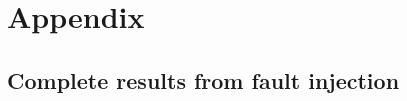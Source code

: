 \section{Appendix}

\subsection{Complete results from fault injection}\label{appendix:complete_injection_results}
\begin{comment}
\begin{verbatim}[label=lst:injection_results]

Filename                        Average Difference From Control         Alternative Implementation Results
seidel-2d.float.txt             0.0                                     0.00010252590179347587
seidel-2d.txt                   0.00010252590179347587                  0.0
seidel-2d_bit_no_1.fixed.txt    0.00010252973353766834                  7.836499591601375e-15
seidel-2d_bit_no_1.float.txt    7.836499591601375e-15                   0.00010252973353766834
seidel-2d_bit_no_2.fixed.txt    0.00010242978918456464                  1.0070183402433041e-14
seidel-2d_bit_no_2.float.txt    1.0070183402433041e-14                  0.00010242978918456464
seidel-2d_bit_no_3.fixed.txt    0.00010269591987037501                  1.7122632695390493e-14
seidel-2d_bit_no_3.float.txt    1.7122632695390493e-14                  0.00010269591987037501
seidel-2d_bit_no_4.fixed.txt    0.00010227745091820854                  2.8727424627485174e-14
seidel-2d_bit_no_4.float.txt    2.8727424627485174e-14                  0.00010227745091820854
seidel-2d_bit_no_5.fixed.txt    0.00010277981877232038                  5.09567649902877e-14
seidel-2d_bit_no_5.float.txt    5.09567649902877e-14                    0.00010277981877232038
seidel-2d_bit_no_6.fixed.txt    0.00010250126707458161                  8.628055195216561e-14
seidel-2d_bit_no_6.float.txt    8.628055195216561e-14                   0.00010250126707458161
seidel-2d_bit_no_7.fixed.txt    0.00010450026309392104                  1.2886278998079994e-13
seidel-2d_bit_no_7.float.txt    1.2886278998079994e-13                  0.00010450026309392104
seidel-2d_bit_no_8.fixed.txt    0.00010662387752436846                  2.3631074870349154e-13
seidel-2d_bit_no_8.float.txt    2.3631074870349154e-13                  0.00010662387752436846
seidel-2d_bit_no_9.fixed.txt    9.194230723288186e-05                   4.625698030993539e-13
seidel-2d_bit_no_9.float.txt    4.625698030993539e-13                   9.194230723288186e-05

\end{comment}
